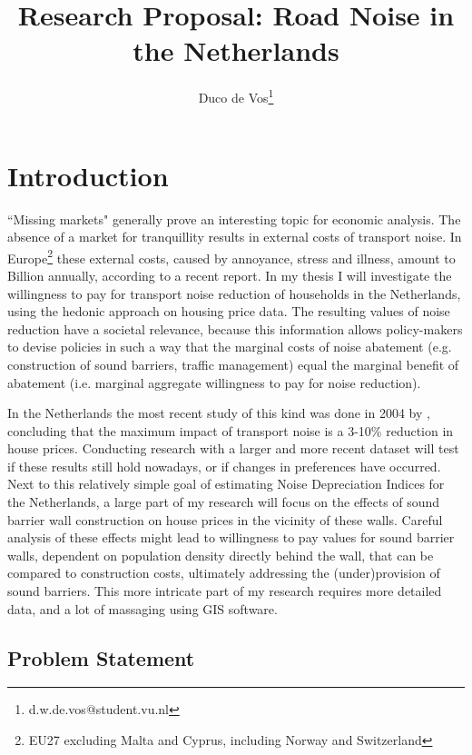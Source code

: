 \documentclass[]{scrartcl}
\title{Research Proposal: Road Noise in the Netherlands}
\author{Duco de Vos\thanks{d.w.de.vos@student.vu.nl}}
\affil{Vrije Universiteit Amsterdam}
\begin{document}
\maketitle

\section{Introduction}

``Missing markets" generally prove an interesting topic for economic analysis. The absence of a market for tranquillity results in external costs of transport noise. In Europe\footnote{EU27 excluding Malta and Cyprus, including Norway and Switzerland} these external costs, caused by annoyance, stress and illness, amount to  Billion annually, according to a recent report\citep{CEDelft2011}. In my thesis I will investigate the willingness to pay for transport noise reduction of households in the Netherlands, using the hedonic approach on housing price data. The resulting values of noise reduction have a societal relevance, because this information allows policy-makers to devise policies in such a way that the marginal costs of noise abatement (e.g. construction of sound barriers, traffic management) equal the marginal benefit of abatement (i.e. marginal aggregate willingness to pay for noise reduction). 

In the Netherlands the most recent study of this kind was done in 2004 by \cite{Theebe2004}, concluding that the maximum impact of transport noise is a 3-10\% reduction in house prices. Conducting research with a larger and more recent dataset will test if these results still hold nowadays, or if changes in preferences have occurred. Next to this relatively simple goal of estimating Noise Depreciation Indices for the Netherlands, a large part of my research will focus on the effects of sound barrier wall construction on house prices in the vicinity of these walls. Careful analysis of these effects might lead to willingness to pay values for sound barrier walls, dependent on population density directly behind the wall, that can be compared to construction costs, ultimately addressing the (under)provision of sound barriers. This more intricate part of my research requires more detailed data, and a lot of massaging using GIS software.  

\subsection{Problem Statement}
\end{document}
